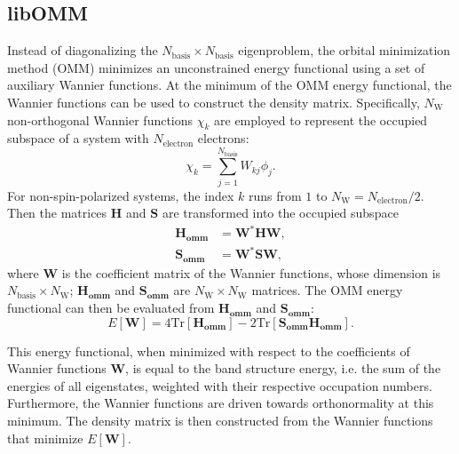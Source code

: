 \documentclass{report}
\begin{document}
\subsection{libOMM}
\label{subsec:solvers_omm}
Instead of diagonalizing the $N_\text{basis} \times N_\text{basis}$ eigenproblem, the orbital minimization method (OMM) minimizes an unconstrained energy functional using a set of auxiliary Wannier functions.  At the minimum of the OMM energy functional, the Wannier functions can be used to construct the density matrix.  Specifically, $N_\text{W}$ non-orthogonal Wannier functions $\chi_k$ are employed to represent the occupied subspace of a system with $N_\text{electron}$ electrons:
\begin{equation}
\label{eq:wannier}
\chi_k = \sum_{j=1}^{N_\text{basis}} W_{kj} \phi_j .
\end{equation}
For non-spin-polarized systems, the index $k$ runs from $1$ to $N_\text{W} = N_\text{electron}/2$.  Then the matrices $\boldsymbol{H}$ and $\boldsymbol{S}$ are transformed into the occupied subspace
\begin{equation}
\label{eq:reduced_ham_ovlp}
\begin{split}
\boldsymbol{H_\text{omm}} & = \boldsymbol{W}^* \boldsymbol{H} \boldsymbol{W} ,\\
\boldsymbol{S_\text{omm}} & = \boldsymbol{W}^* \boldsymbol{S} \boldsymbol{W} ,
\end{split}
\end{equation}
where $\boldsymbol{W}$ is the coefficient matrix of the Wannier functions, whose dimension is $N_\text{basis} \times N_\text{W}$; $\boldsymbol{H_\text{omm}}$ and $\boldsymbol{S_\text{omm}}$ are $N_\text{W} \times N_\text{W}$ matrices.  The OMM energy functional can then be evaluated from $\boldsymbol{H_\text{omm}}$ and $\boldsymbol{S_\text{omm}}$:
\begin{equation}
\label{eq:omm_energy}
E[\boldsymbol{W}] = 4 \text{Tr}[\boldsymbol{H_\text{omm}}] - 2 \text{Tr}[\boldsymbol{S_\text{omm} H_\text{omm}}] .
\end{equation}

This energy functional, when minimized with respect to the coefficients of Wannier functions $\boldsymbol{W}$, is equal to the band structure energy, i.e. the sum of the energies of all eigenstates, weighted with their respective occupation numbers.  Furthermore, the Wannier functions are driven towards orthonormality at this minimum.  The density matrix is then constructed from the Wannier functions that minimize $E[\boldsymbol{W}]$.
\end{document}
